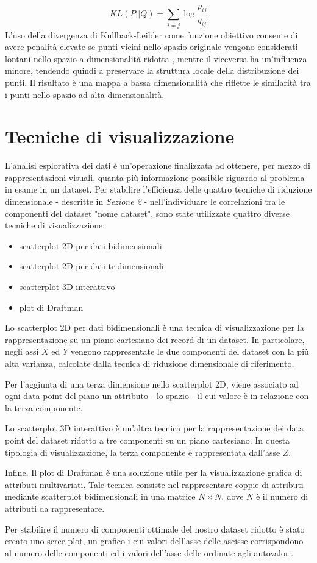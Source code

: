 \documentclass[11pt,a4paper,twocolumn]{article}
\begin{document}
\begin{equation}
\nonumber
KL(P\lvert \lvert Q)=\sum_{i \neq j}{\log{\frac{p_{ij}}{q_{ij}}}}
\end{equation}
L'uso della divergenza di Kullback-Leibler come funzione obiettivo consente di avere penalità elevate se punti vicini nello spazio originale  vengono considerati lontani nello spazio a dimensionalità ridotta , mentre il viceversa ha un'influenza minore, tendendo quindi a preservare la struttura locale della distribuzione dei punti. Il risultato è una mappa a bassa dimensionalità che riflette le similarità tra i punti nello spazio ad alta dimensionalità.
\section{Tecniche di visualizzazione}
	L'analisi esplorativa dei dati è un'operazione finalizzata ad ottenere, per mezzo di rappresentazioni visuali, quanta più informazione possibile riguardo al problema in esame in un dataset.
	Per stabilire l'efficienza delle quattro tecniche di riduzione dimensionale - descritte in \emph{Sezione 2} - nell'individuare le correlazioni tra le componenti del dataset "nome dataset", sono state utilizzate quattro diverse tecniche di visualizzazione:

	\begin{itemize}
		\item scatterplot 2D per dati bidimensionali
		\item scatterplot 2D per dati tridimensionali
		\item scatterplot 3D interattivo
		\item plot di Draftman
	\end{itemize}

	Lo scatterplot 2D per dati bidimensionali è una tecnica di visualizzazione per la rappresentazione su un piano cartesiano dei record di un dataset. In particolare, negli assi $X$ ed $Y$ vengono rappresentate le due componenti del dataset con la più alta varianza, calcolate dalla tecnica di riduzione dimensionale di riferimento. \par
	Per l'aggiunta di una terza dimensione nello scatterplot 2D, viene associato ad ogni data point del piano un attributo - lo spazio - il cui valore è in relazione con la terza componente. \par
	Lo scatterplot 3D interattivo è un'altra tecnica per la rappresentazione dei data point del dataset ridotto a tre componenti su un piano cartesiano. In questa tipologia di visualizzazione, la terza componente è rappresentata dall'asse $ Z $. \par
	Infine, Il plot di Draftman è una soluzione utile per la visualizzazione grafica di attributi multivariati. Tale tecnica consiste nel rappresentare coppie di attributi mediante scatterplot bidimensionali in una matrice $ N \times N $, dove $ N $ è il numero di attributi da rappresentare. \par
	Per stabilire il numero di componenti ottimale del nostro dataset ridotto è stato creato uno scree-plot, un grafico i cui valori dell'asse delle ascisse corrispondono al numero delle componenti ed i valori dell'asse delle ordinate agli autovalori.
\end{document}
